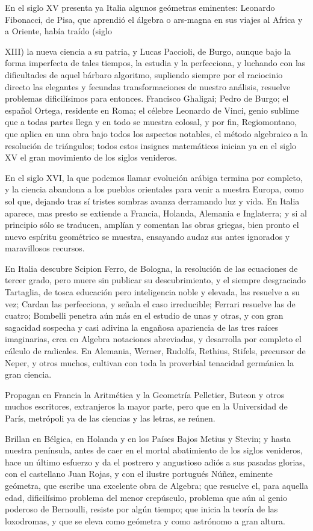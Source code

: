 \documentclass[a4paper, 12pt]{article}
\begin{document}
En el siglo XV presenta ya Italia algunos geómetras eminentes: Leonardo Fibonacci, de Pisa, que aprendió el álgebra o ars-magna en sus viajes al Africa y a Oriente, había traído (siglo {XIII) la nueva ciencia a su patria, y Lucas Paccioli, de Burgo, aunque bajo la forma imperfecta de tales tiempos, la estudia y la perfecciona, y luchando con las dificultades de aquel bárbaro algoritmo, supliendo siempre por el raciocinio directo las elegantes y fecundas transformaciones de nuestro análisis, resuelve problemas dificilísimos para entonces.  Francisco Ghaligai; Pedro de Burgo; el español Ortega, residente en Roma; el célebre Leonardo de Vinci, genio sublime que a todas partes llega y en todo se muestra colosal, y por fin, Regiomontano, que aplica en una obra bajo todos los aspectos notables, el método algebraico a la resolución de triángulos; todos estos insignes matemáticos inician ya en el siglo XV el gran movimiento de los siglos venideros.

En el siglo XVI, la que podemos llamar evolución arábiga termina por completo, y la ciencia abandona a los pueblos orientales para venir a nuestra Europa, como sol que, dejando tras sí tristes sombras avanza derramando luz y vida.  En Italia aparece, mas presto se extiende a Francia, Holanda, Alemania e Inglaterra; y si al principio sólo se traducen, amplían y comentan las obras griegas, bien pronto el nuevo espíritu geométrico se muestra, ensayando audaz sus antes ignorados y maravillosos recursos.

En Italia descubre Scipion Ferro, de Bologna, la resolución de las ecuaciones de tercer grado, pero muere sin publicar su descubrimiento, y el siempre desgraciado Tartaglia, de tosca educación pero inteligencia noble y elevada, las resuelve a su vez; Cardan las perfecciona, y señala el caso irreducible; Ferrari resuelve las de cuatro; Bombelli penetra aún más en el estudio de unas y otras, y con gran sagacidad sospecha y casi adivina la engañosa apariencia de las tres raíces imaginarias, crea en Algebra notaciones abreviadas, y desarrolla por completo el cálculo de radicales.  En Alemania, Werner, Rudolfs, Rethius, Stifels, precursor de Neper, y otros muchos, cultivan con toda la proverbial tenacidad germánica la gran ciencia.

Propagan en Francia la Aritmética y la Geometría Pelletier, Buteon y otros muchos escritores, extranjeros la mayor parte, pero que en la Universidad de París, metrópoli ya de las ciencias y las letras, se reúnen.

Brillan en Bélgica, en Holanda y en los Países Bajos Metius y Stevin; y hasta nuestra península, antes de caer en el mortal abatimiento de los siglos venideros, hace un último esfuerzo y da el postrero y angustioso adiós a sus pasadas glorias, con el castellano Juan Rojas, y con el ilustre portugués Núñez, eminente geómetra, que escribe una excelente obra de Algebra; que resuelve el, para aquella edad, dificilísimo problema del menor crepúsculo, problema que aún al genio poderoso de Bernoulli, resiste por algún tiempo; que inicia la teoría de las loxodromas, y que se eleva como geómetra y como astrónomo a gran altura.

}
\end{document}

